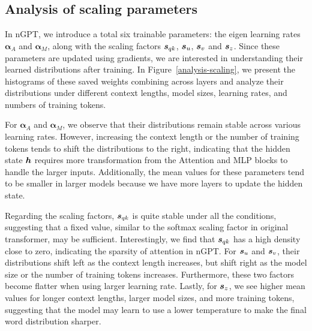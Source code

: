 \documentclass{article} %
\begin{document}
\clearpage
\subsection{Analysis of scaling parameters}
\label{appendix:scalinganalysis}
In nGPT, we introduce a total six trainable parameters: the eigen learning rates $\bm{\alpha}_A$ and $\bm{\alpha}_M$, along with the scaling factors ${\bm{s}}_{qk}$, ${\bm{s}}_u$, ${\bm{s}}_v$ and ${\bm{s}}_z$. Since these parameters are updated using gradients, we are interested in understanding their learned distributions after training. In Figure~\ref{analysis-scaling}, we present the histograms of these saved weights combining across layers and analyze their distributions under different context lengths, model sizes, learning rates, and numbers of training tokens. 

For $\bm{\alpha}_A$ and $\bm{\alpha}_M$, we observe that their distributions remain stable across various learning rates. However, increasing the context length or the number of training tokens tends to shift the distributions to the right, indicating that the hidden state ${\bm{h}}$ requires more transformation from the Attention and MLP blocks to handle the larger inputs. Additionally, the mean values for these parameters tend to be smaller in larger models because we have more layers to update the hidden state. 

Regarding the scaling factors, ${\bm{s}}_{qk}$ is quite stable under all the conditions, suggesting that a fixed value, similar to the softmax scaling factor in original transformer, may be sufficient. Interestingly, we find that ${\bm{s}}_{qk}$ has a high density close to zero, indicating the sparsity of attention in nGPT. For ${\bm{s}}_u$ and ${\bm{s}}_v$, their distributions shift left as the context length increases, but shift right as the model size or the number of training tokens increases. Furthermore, these two factors become flatter when using larger learning rate. Lastly, for ${\bm{s}}_{z}$, we see higher mean values for longer context lengths, larger model sizes, and more training tokens, suggesting that the model may learn to use a lower temperature to make the final word distribution sharper.


\vspace{0.25cm}
\end{document}
